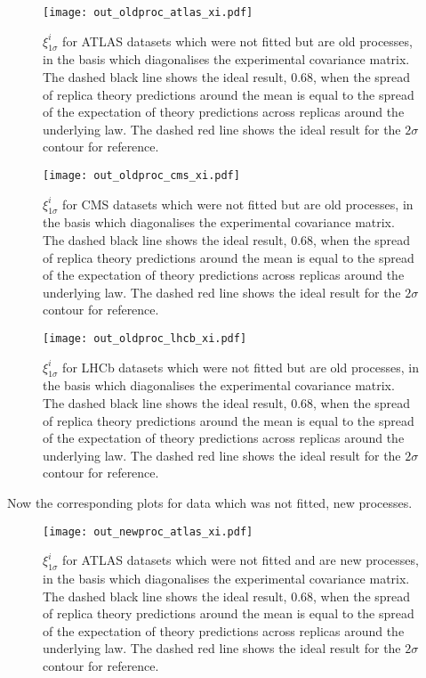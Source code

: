 \begin{figure}[ht]
    \centering
    \texttt{[image: out\_oldproc\_atlas\_xi.pdf]}
    \caption{$\xi_{1\sigma}^{i}$ for ATLAS datasets which were not fitted
    but are old processes, in the basis which diagonalises the experimental
    covariance matrix. The dashed black line shows the ideal result, 0.68, when
    the spread of replica theory predictions around the mean is equal to the
    spread of the expectation of theory predictions across replicas around the
    underlying law. The dashed red line shows the ideal result for the $2\sigma$
    contour for reference.}
    \label{fig:outoldatlasxi}
\end{figure}

\begin{figure}[ht]
    \centering
    \texttt{[image: out\_oldproc\_cms\_xi.pdf]}
    \caption{$\xi_{1\sigma}^{i}$ for CMS datasets which were not fitted
    but are old processes, in the basis which diagonalises the experimental
    covariance matrix. The dashed black line shows the ideal result, 0.68, when
    the spread of replica theory predictions around the mean is equal to the
    spread of the expectation of theory predictions across replicas around the
    underlying law. The dashed red line shows the ideal result for the $2\sigma$
    contour for reference.}
    \label{fig:outoldcmsxi}
\end{figure}

\begin{figure}[ht]
    \centering
    \texttt{[image: out\_oldproc\_lhcb\_xi.pdf]}
    \caption{$\xi_{1\sigma}^{i}$ for LHCb datasets which were not fitted
    but are old processes, in the basis which diagonalises the experimental
    covariance matrix. The dashed black line shows the ideal result, 0.68, when
    the spread of replica theory predictions around the mean is equal to the
    spread of the expectation of theory predictions across replicas around the
    underlying law. The dashed red line shows the ideal result for the $2\sigma$
    contour for reference.}
    \label{fig:outoldlhcbxi}
\end{figure}

\FloatBarrier

Now the corresponding plots for data which was not fitted, new processes.

\begin{figure}[ht]
    \centering
    \texttt{[image: out\_newproc\_atlas\_xi.pdf]}
    \caption{$\xi_{1\sigma}^{i}$ for ATLAS datasets which were not fitted
    and are new processes, in the basis which diagonalises the experimental
    covariance matrix. The dashed black line shows the ideal result, 0.68, when
    the spread of replica theory predictions around the mean is equal to the
    spread of the expectation of theory predictions across replicas around the
    underlying law. The dashed red line shows the ideal result for the $2\sigma$
    contour for reference.}
    \label{fig:outnewatlasxi}
\end{figure}

